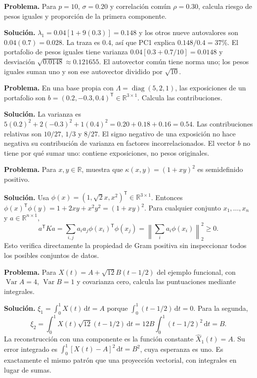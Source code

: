 \documentclass[11pt,a4paper]{article}
\newcommand{\R}{\mathbb R}
\newcommand{\dd}{\,\mathrm d}
\newcommand{\T}{^{\mathsf T}}
\newcommand{\norm}[1]{\left\lVert #1\right\rVert}
\DeclareMathOperator{\Var}{Var}
\DeclareMathOperator{\diag}{diag}
\theoremstyle{definition}
\begin{document}
\begin{ejemplo}
\textbf{Problema.} Para $p=10$, $\sigma=0.20$ y correlación común $\rho=0.30$, calcula riesgo de pesos iguales y proporción de la primera componente.

\textbf{Solución.} $\lambda_1=0.04[1+9(0.3)]=0.148$ y los otros nueve autovalores son $0.04(0.7)=0.028$. La traza es $0.4$, así que PC1 explica $0.148/0.4=37\%$. El portafolio de pesos iguales tiene varianza $0.04[0.3+0.7/10]=0.0148$ y desviación $\sqrt{0.0148}\approx0.121655$. El autovector común tiene norma uno; los pesos iguales suman uno y son ese autovector dividido por $\sqrt{10}$.
\end{ejemplo}
\begin{ejemplo}
\textbf{Problema.} En una base propia con $\Lambda=\diag(5,2,1)$, las exposiciones de un portafolio son $b=(0.2,-0.3,0.4)\T\in\R^{3\times1}$. Calcula las contribuciones.

\textbf{Solución.} La varianza es $5(0.2)^2+2(-0.3)^2+1(0.4)^2=0.20+0.18+0.16=0.54$. Las contribuciones relativas son $10/27$, $1/3$ y $8/27$. El signo negativo de una exposición no hace negativa su contribución de varianza en factores incorrelacionados. El vector $b$ no tiene por qué sumar uno: contiene exposiciones, no pesos originales.
\end{ejemplo}
\begin{ejemplo}
\textbf{Problema.} Para $x,y\in\R$, muestra que $\kappa(x,y)=(1+xy)^2$ es semidefinido positivo.

\textbf{Solución.} Usa $\phi(x)=(1,\sqrt2x,x^2)\T\in\R^{3\times1}$. Entonces $\phi(x)\T\phi(y)=1+2xy+x^2y^2=(1+xy)^2$. Para cualquier conjunto $x_1,\ldots,x_n$ y $a\in\R^{n\times1}$,
\[
a\T Ka=\sum_{i,j}a_ia_j\phi(x_i)\T\phi(x_j)=\norm{\sum_i a_i\phi(x_i)}_2^2\ge0.
\]
Esto verifica directamente la propiedad de Gram positiva sin inspeccionar todos los posibles conjuntos de datos.
\end{ejemplo}
\begin{ejemplo}
\textbf{Problema.} Para $X(t)=A+\sqrt{12}B(t-1/2)$ del ejemplo funcional, con $\Var A=4$, $\Var B=1$ y covarianza cero, calcula las puntuaciones mediante integrales.

\textbf{Solución.} $\xi_1=\int_0^1X(t)\dd t=A$ porque $\int_0^1(t-1/2)\dd t=0$. Para la segunda,
\[
\xi_2=\int_0^1X(t)\sqrt{12}(t-1/2)\dd t
=12B\int_0^1(t-1/2)^2\dd t=B.
\]
La reconstrucción con una componente es la función constante $\widehat X_1(t)=A$. Su error integrado es $\int_0^1[X(t)-A]^2\dd t=B^2$, cuya esperanza es uno. Es exactamente el mismo patrón que una proyección vectorial, con integrales en lugar de sumas.
\end{ejemplo}
\end{document}
